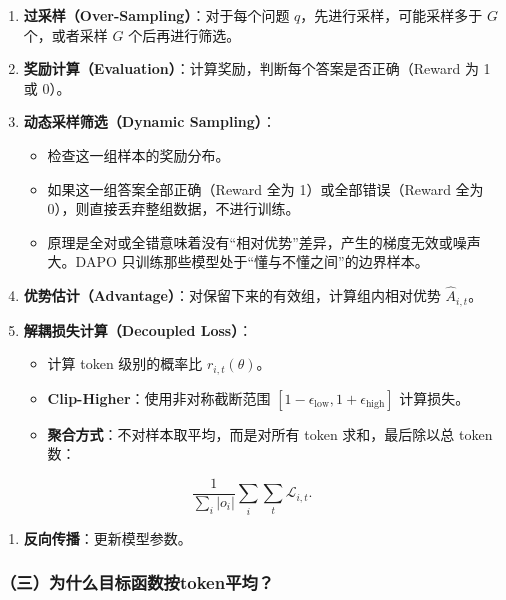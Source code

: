 \begin{enumerate}
\def\labelenumi{\arabic{enumi}.}
\tightlist
\item
  \textbf{过采样（Over-Sampling）}：对于每个问题 \(q\)，先进行采样，可能采样多于 \(G\) 个，或者采样 \(G\) 个后再进行筛选。
\item
  \textbf{奖励计算（Evaluation）}：计算奖励，判断每个答案是否正确（Reward 为 1 或 0）。
\item
  \textbf{动态采样筛选（Dynamic Sampling）}：

  \begin{itemize}
  \tightlist
  \item
    检查这一组样本的奖励分布。
  \item
    如果这一组答案全部正确（Reward 全为 1）或全部错误（Reward 全为 0），则直接丢弃整组数据，不进行训练。
  \item
    原理是全对或全错意味着没有``相对优势''差异，产生的梯度无效或噪声大。DAPO 只训练那些模型处于``懂与不懂之间''的边界样本。
  \end{itemize}
\item
  \textbf{优势估计（Advantage）}：对保留下来的有效组，计算组内相对优势 \(\hat{A}_{i,t}\)。
\item
  \textbf{解耦损失计算（Decoupled Loss）}：

  \begin{itemize}
  \tightlist
  \item
    计算 token 级别的概率比 \(r_{i,t}(\theta)\)。
  \item
    \textbf{Clip-Higher}：使用非对称截断范围 \([1-\epsilon_{\mathrm{low}},1+\epsilon_{\mathrm{high}}]\) 计算损失。
  \item
    \textbf{聚合方式}：不对样本取平均，而是对所有 token 求和，最后除以总 token 数：
  \end{itemize}
\end{enumerate}

\[
\frac{1}{\sum_i |o_i|}
\sum_i \sum_t \mathcal{L}_{i,t}.
\]

\begin{enumerate}
\def\labelenumi{\arabic{enumi}.}
\setcounter{enumi}{5}
\tightlist
\item
  \textbf{反向传播}：更新模型参数。
\end{enumerate}

\hypertarget{ux4e09ux4e3aux4ec0ux4e48ux76eeux6807ux51fdux6570ux6309tokenux5e73ux5747}{%
\subsubsection{（三）为什么目标函数按token平均？}\label{ux4e09ux4e3aux4ec0ux4e48ux76eeux6807ux51fdux6570ux6309tokenux5e73ux5747}}


